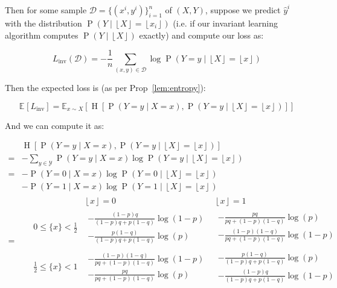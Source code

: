 \documentclass[12pt]{article}
\newcommand{\Ent}[1]{\operatorname{H}\left[#1\right]}
\newcommand{\E}[2][{}]{\mathbb{E}_{#1}\left[#2\right]}
\newcommand{\Prob}[1]{\operatorname{P}\left(#1\right)}
\newcommand{\floor}[1]{\left\lfloor #1 \right\rfloor}
\theoremstyle{definition}
\numberwithin{equation}{section}
\numberwithin{figure}{section}
\numberwithin{table}{section}
\begin{document}
Then for some sample $\mathcal{D}=\{(x^i,y^i)\}_{i=1}^n$ of $(X, Y)$, suppose we predict $\hat{y}^i$ with the distribution $\Prob{Y\mid \floor{X}=\floor{x_i}}$ (i.e. if our invariant learning algorithm computes $\Prob{Y\mid \floor{X}}$ exactly) and compute our loss as:

\begin{equation*}
    L_{\operatorname{inv}}(\mathcal{D})=-\frac1n \sum_{(x, y)\in\mathcal{D}}{\log \Prob{Y = y \mid \floor{X}=\floor{x}}}
\end{equation*}

Then the expected loss is (as per Prop~\ref{lem:entropy}):

\begin{equation*}
    \E{L_{\operatorname{inv}}}=\E[x\sim X]{\Ent{\Prob{Y=y\mid X=x}, \Prob{Y=y\mid \floor{X}=\floor{x}}}}
\end{equation*}

And we can compute it as:

\begin{align*}
    & 
    \Ent{\Prob{Y=y\mid X=x}, \Prob{Y=y\mid \floor{X}=\floor{x}}} \\
    = &
    -\sum_{y\in\mathcal{Y}}{\Prob{Y=y\mid X = x}\log \Prob{Y=y\mid \floor{X}=\floor{x}}} \\
    = &
    -\Prob{Y=0\mid X = x}\log \Prob{Y=0\mid \floor{X}=\floor{x}} \\
    & -\Prob{Y=1\mid X = x}\log \Prob{Y=1\mid \floor{X}=\floor{x}}\\
    = & \,\,\,\,\,\,
    \begin{array}{c|c|c}
        & 
        \floor{x}=0 
        & 
        \floor{x}=1 
        \\
        \hline
        0 \le \{x\} < \frac12 
        & 
        \begin{array}{l}
            -\frac{(1-p)q}{(1-p)q+p(1-q)}\log(1-p) \\
            -\frac{p(1-q)}{(1-p)q+p(1-q)}\log(p)
        \end{array}
        & 
        \begin{array}{l}
            -\frac{pq}{pq+(1-p)(1-q)}\log(p) \\
            -\frac{(1-p)(1-q)}{pq+(1-p)(1-q)}\log(1-p) 
        \end{array}
        \\
        \hline
        \frac12 \le \{x\} < 1 
        & 
        \begin{array}{l}
            -\frac{(1-p)(1-q)}{pq+(1-p)(1-q)}\log(1-p) \\
            -\frac{pq}{pq+(1-p)(1-q)}\log(p)
        \end{array}
        &
        \begin{array}{l}
            -\frac{p(1-q)}{(1-p)q+p(1-q)}\log(p) \\
            -\frac{(1-p)q}{(1-p)q+p(1-q)}\log(1-p) 
        \end{array}
    \end{array}
\end{align*}
\end{document}
